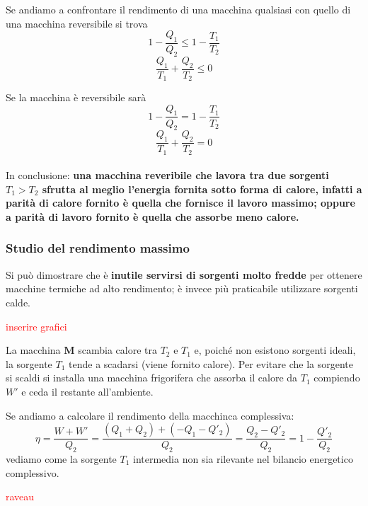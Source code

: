 \documentclass[x11names]{report}
\begin{document}
\noindent
Se andiamo a confrontare il rendimento di una macchina qualsiasi con quello di una macchina reversibile si trova
\[ 
1 - \frac{Q_{1}}{Q_{2}} \leq 1 - \frac{T_{1}}{T_{2}} 
\]
\begin{equation}
	\frac{Q_{1}}{T_{1}} + \frac{Q_{2}}{T_{2}} \leq 0
\end{equation}

Se la macchina è reversibile sarà 
\[ 
1 - \frac{Q_{1}}{Q_{2}} = 1 - \frac{T_{1}}{T_{2}} 
\]
\[ 
\frac{Q_{1}}{T_{1}} + \frac{Q_{2}}{T_{2}} = 0
\]
\\

\noindent
In conclusione: \textbf{una macchina reveribile che lavora tra due sorgenti \(T_{1} > T_{2}\) sfrutta al meglio l'energia fornita sotto forma di calore, infatti a parità di calore fornito è quella che fornisce il  lavoro massimo; oppure a parità di lavoro fornito è quella che assorbe meno calore.}

\subsubsection{Studio del rendimento massimo}
Si può dimostrare che è \textbf{inutile servirsi di sorgenti molto fredde} per ottenere macchine termiche ad alto rendimento; è invece più praticabile utilizzare sorgenti calde.
\begin{center}
	\textcolor{red}{inserire grafici}
\end{center}
La macchina \(\boldsymbol{M}\) scambia calore tra \(T_{2}\) e \(T_{1}\) e, poiché non esistono sorgenti ideali, la sorgente \(T_{1}\) tende a scadarsi (viene fornito calore). Per evitare che la sorgente si scaldi si installa una macchina frigorifera che assorba il calore da \(T_{1}\) compiendo \(W'\) e ceda il restante all'ambiente.

Se andiamo a calcolare il rendimento della macchinca complessiva:
\[ 
\eta = \frac{W + W'}{Q_{2}} = \frac{(Q_{1} + Q_{2}) + (- Q_{1} - Q'_{2})}{Q_{2}} = \frac{Q_{2} - Q'_{2}}{Q_{2}} = 1 - \frac{Q'_{2}}{Q_{2}}
\]
vediamo come la sorgente \(T_{1}\) intermedia non sia rilevante nel bilancio energetico complessivo.

\begin{center}
	\textcolor{red}{raveau}
\end{center}
\end{document}
